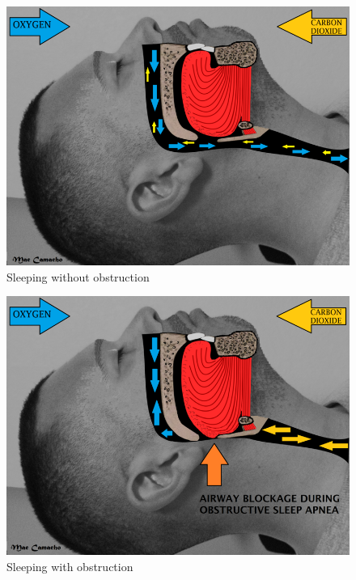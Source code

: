 \documentclass[12pt,a4paper]{report}
\begin{document}
\begin{figure}[h]
\centering
\includegraphics[max height=\textheight, max width=\textwidth, keepaspectratio, scale=0.5]{02_sleeping_without_obstruction.png}
\caption{Sleeping without obstruction}
\label{fig:sleep_without_obstruction}
\end{figure}

\begin{figure}[h]
\centering
\includegraphics[max height=\textheight, max width=\textwidth, keepaspectratio, scale=0.5]{03_sleeping_with_obstruction.png}
\caption{Sleeping with obstruction}
\label{fig:sleep_with_obstruction}
\end{figure}
\end{document}
